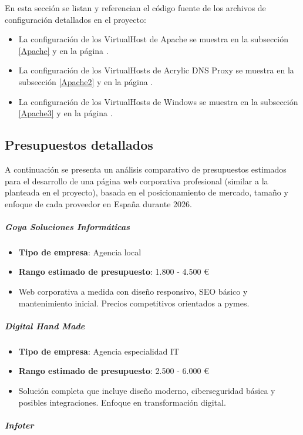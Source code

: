 \documentclass[11.5pt]{article}
\begin{document}
	En esta sección se listan y referencian el código fuente de los archivos de configuración detallados en el proyecto:
	
	\begin{itemize}
		\item La configuración de los VirtualHost de Apache se muestra en la subsección \ref{Apache} y en la página \pageref{Apache}.
		\item La configuración de los VirtualHosts de Acrylic DNS Proxy se muestra en la subsección \ref{Apache2} y en la página \pageref{Apache2}.
		\item La configuración de los VirtualHosts de Windows se muestra en la subsección \ref{Apache3} y en la página \pageref{Apache3}.
	\end{itemize}
	\subsection{Presupuestos detallados}
	
	A continuación se presenta un análisis comparativo de presupuestos estimados para el desarrollo de una página web corporativa profesional (similar a la planteada en el proyecto), basada en el posicionamiento de mercado, tamaño y enfoque de cada proveedor en España durante 2026.
	
	\subparagraph*{Goya Soluciones Informáticas}
	
	\begin{itemize}
		\item \textbf{Tipo de empresa}: Agencia local
		\item \textbf{Rango estimado de presupuesto}: 1.800 - 4.500 €
		\item Web corporativa a medida con diseño responsivo, SEO básico y mantenimiento inicial. Precios competitivos orientados a pymes.
	\end{itemize}
	
	\subparagraph*{Digital Hand Made}
	
	\begin{itemize}
		\item \textbf{Tipo de empresa}: Agencia especialidad IT
		\item \textbf{Rango estimado de presupuesto}: 2.500 - 6.000 €
		\item Solución completa que incluye diseño moderno, ciberseguridad básica y posibles integraciones. Enfoque en transformación digital.
	\end{itemize}
	
	\subparagraph*{Infoter}
	
\end{document}
